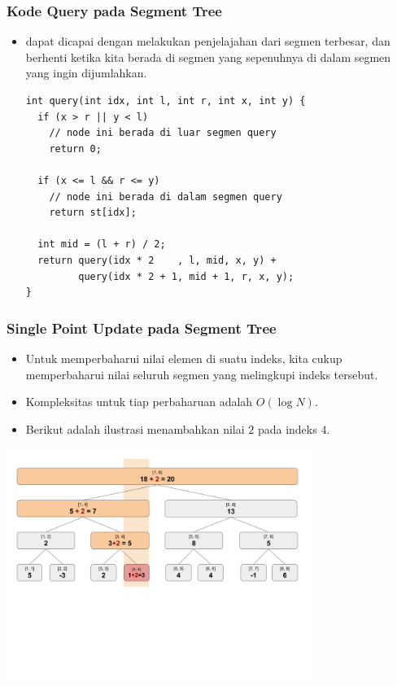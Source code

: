 \begin{frame}[fragile]
\frametitle{Kode Query pada Segment Tree}
\begin{itemize}
  \item \fQuery dapat dicapai dengan melakukan penjelajahan \fsegmentTree dari segmen terbesar, dan berhenti ketika kita berada di segmen yang sepenuhnya di dalam segmen yang ingin dijumlahkan.
  \begin{lstlisting}
int query(int idx, int l, int r, int x, int y) {
  if (x > r || y < l)
    // node ini berada di luar segmen query
    return 0;

  if (x <= l && r <= y)
    // node ini berada di dalam segmen query
    return st[idx];
  
  int mid = (l + r) / 2;
  return query(idx * 2    , l, mid, x, y) +
         query(idx * 2 + 1, mid + 1, r, x, y);
}
\end{lstlisting}
\end{itemize}
\end{frame}

\begin{frame}
\frametitle{Single Point Update pada Segment Tree}
\begin{itemize}
  \item Untuk memperbaharui nilai elemen di suatu indeks, kita cukup memperbaharui nilai seluruh segmen yang melingkupi indeks tersebut.
  \item Kompleksitas untuk tiap perbaharuan adalah $O(\log N)$.
  \item Berikut adalah ilustrasi menambahkan nilai $2$ pada indeks $4$.
\end{itemize}
\begin{center}
  \includegraphics[width=10cm]{asset/segtree-update.png}
\end{center}
\end{frame}

